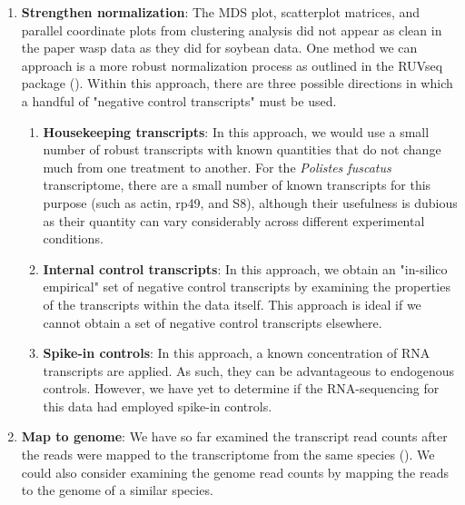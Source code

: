 \documentclass[11pt,a4paper,oldfontcommands,openany]{memoir}
\numberwithin{equation}{section} %
\begin{document}
\begin{enumerate}
\item \textbf{Strengthen normalization}: The MDS plot, scatterplot matrices, and parallel coordinate plots from clustering analysis did not appear as clean in the paper wasp data as they did for soybean data. One method we can approach is a more robust normalization process as outlined in the RUVseq package (\citealt{ruvseq}). Within this approach, there are three possible directions in which a handful of "negative control transcripts" must be used.

\begin{enumerate}
\item \textbf{Housekeeping transcripts}: In this approach, we would use a small number of robust transcripts with known quantities that do not change much from one treatment to another. For the \textit{Polistes fuscatus} transcriptome, there are a small number of known transcripts for this purpose (such as actin, rp49, and S8), although their usefulness is dubious as their quantity can vary considerably across different experimental conditions.
\item \textbf{Internal control transcripts}: In this approach, we obtain an "in-silico empirical" set of negative control transcripts by examining the properties of the transcripts within the data itself. This approach is ideal if we cannot obtain a set of negative control transcripts elsewhere.
\item \textbf{Spike-in controls}: In this approach, a known concentration of RNA transcripts are applied. As such, they can be advantageous to endogenous controls. However, we have yet to determine if the RNA-sequencing for this data had employed spike-in controls. 
\end{enumerate}

\item \textbf{Map to genome}: We have so far examined the transcript read counts after the reads were mapped to the transcriptome from the same species (\citealt{pw19}). We could also consider examining the genome read counts by mapping the reads to the genome of a similar species.


\end{enumerate}
\end{document}
